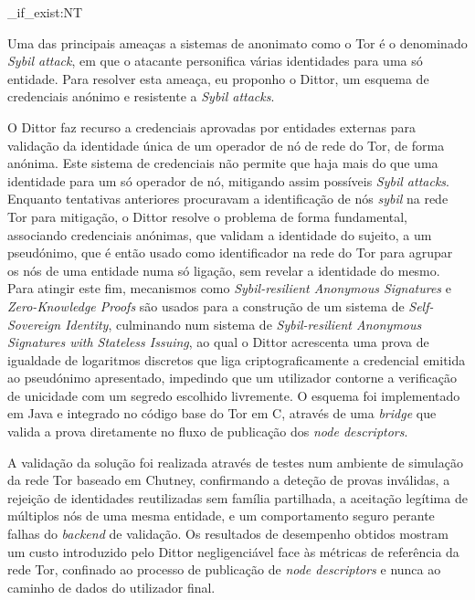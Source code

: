 
\ExplSyntaxOn
\cs_if_exist:NT \TitleOnHeader
  { \TitleOnHeader }
\ExplSyntaxOff

%

Uma das principais ameaças a sistemas de anonimato como o Tor é o denominado \textit{Sybil attack}, em que o atacante personifica várias identidades para uma só entidade. Para resolver esta ameaça, eu proponho o Dittor, um esquema de credenciais anónimo e resistente a \textit{Sybil attacks}.

O Dittor faz recurso a credenciais aprovadas por entidades externas para validação da identidade única de um operador de nó de rede do Tor, de forma anónima. Este sistema de credenciais não permite que haja mais do que uma identidade para um só operador de nó, mitigando assim possíveis \textit{Sybil attacks}. Enquanto tentativas anteriores procuravam a identificação de nós \textit{sybil} na rede Tor para mitigação, o Dittor resolve o problema de forma fundamental, associando credenciais anónimas, que validam a identidade do sujeito, a um pseudónimo, que é então usado como identificador na rede do Tor para agrupar os nós de uma entidade numa só ligação, sem revelar a identidade do mesmo. Para atingir este fim, mecanismos como \textit{Sybil-resilient Anonymous Signatures} e \textit{Zero-Knowledge Proofs} são usados para a construção de um sistema de \textit{Self-Sovereign Identity}, culminando num sistema de \textit{Sybil-resilient Anonymous Signatures with Stateless Issuing}, ao qual o Dittor acrescenta uma prova de igualdade de logaritmos discretos que liga criptograficamente a credencial emitida ao pseudónimo apresentado, impedindo que um utilizador contorne a verificação de unicidade com um segredo escolhido livremente. O esquema foi implementado em Java e integrado no código base do Tor em C, através de uma \textit{bridge} que valida a prova diretamente no fluxo de publicação dos \textit{node descriptors}.

A validação da solução foi realizada através de testes num ambiente de simulação da rede Tor baseado em Chutney, confirmando a deteção de provas inválidas, a rejeição de identidades reutilizadas sem família partilhada, a aceitação legítima de múltiplos nós de uma mesma entidade, e um comportamento seguro perante falhas do \textit{backend} de validação. Os resultados de desempenho obtidos mostram um custo introduzido pelo Dittor negligenciável face às métricas de referência da rede Tor, confinado ao processo de publicação de \textit{node descriptors} e nunca ao caminho de dados do utilizador final.

